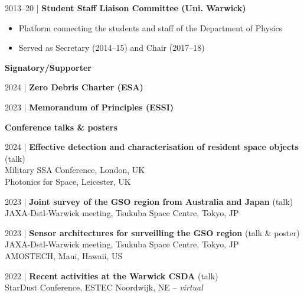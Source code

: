 \documentclass[10pt,a4paper]{altacv}
\begin{document}
\smallskip

\small 2013--20 | \textbf{Student Staff Liaison Committee (Uni. Warwick)} \\
\smallskip
\begin{itemize}
	\item Platform connecting the students and staff of the Department of Physics
	\item Served as Secretary (2014--15) and Chair (2017--18)
\end{itemize}

\divider

\normalsize \textbf{Signatory/Supporter}

\medskip

\small 2024 | \textbf{Zero Debris Charter (ESA)} \\

\smallskip

\small 2023 | \textbf{Memorandum of Principles (ESSI)} \\

\smallskip

\medskip




\normalsize \textbf{Conference talks \& posters}

\medskip

\small 2024 | \textbf{Effective detection and characterisation of resident space objects} (talk) \\
Military SSA Conference, London, UK \\
Photonics for Space, Leicester, UK


\small 2023 | \textbf{Joint survey of the GSO region from Australia and Japan} (talk) \\
JAXA-Dstl-Warwick meeting, Tsukuba Space Centre, Tokyo, JP

\smallskip

\small 2023 | \textbf{Sensor architectures for surveilling the GSO region} (talk \& poster) \\
JAXA-Dstl-Warwick meeting, Tsukuba Space Centre, Tokyo, JP \\
AMOSTECH, Maui, Hawaii, US 

\smallskip

\small 2022 | \textbf{Recent activities at the Warwick CSDA} (talk) \\
StarDust Conference, ESTEC Noordwijk, NE -- \textit{virtual}
\end{document}
